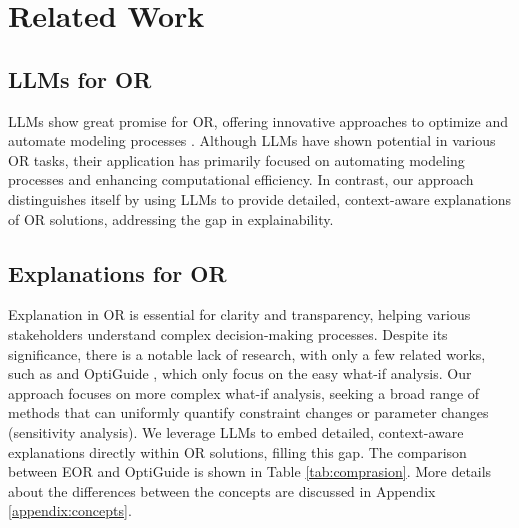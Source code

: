\section{Related Work}

\subsection{LLMs for OR}
LLMs show great promise for OR, offering innovative approaches to optimize and automate modeling processes \citep{xiao2023chain, ahmaditeshnizi2024optimus, tang2024orlm, zhang2024solving,huang2024large,mostajabdaveh2024optimization}. Although LLMs have shown potential in various OR tasks, their application has primarily focused on automating modeling processes and enhancing computational efficiency. In contrast, our approach distinguishes itself by using LLMs to provide detailed, context-aware explanations of OR solutions, addressing the gap in explainability.

\subsection{Explanations for OR}

Explanation in OR is essential for clarity and transparency, helping various stakeholders understand complex decision-making processes. Despite its significance, there is a notable lack of research, with only a few related works, such as \citep{thuy2024explainability,erwig2024explanations,de2024explainable} and OptiGuide \citep{li2023large}, which only focus on the easy what-if analysis. Our approach focuses on more complex what-if analysis, seeking a broad range of methods that can uniformly quantify constraint changes or parameter changes (sensitivity analysis). We leverage LLMs to embed detailed, context-aware explanations directly within OR solutions, filling this gap.
The comparison between EOR and OptiGuide is shown in Table \ref{tab:comprasion}. More details about the differences between the concepts are discussed in Appendix \ref{appendix:concepts}.

